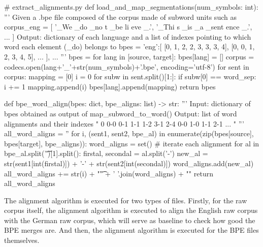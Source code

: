 \begin{python}
# extract_alignments.py
def load_and_map_segmentations(num_symbols: int):
  '''
  Given a .bpe file composed of the corpus made of subword units such as
  corpus_eng = [
    '_We _do _no t _be li eve _.',
    '_Thi s _is _a _sent ence _.',
    ...
  ]
  Output: dictionary of each language and 
  a list of indexes pointing to which word each element (_do) belongs to
  bpes = {
    'eng':[
      [0, 1, 2, 2, 3, 3, 3, 4],
      [0, 0, 1, 2, 3, 4, 5],
      ...
    ],
    ...
  } 
  '''
  bpes = {}
  for lang in [source, target]:
    bpes[lang] = []
    corpus = codecs.open(lang+'_'+str(num_symbols)+'.bpe', encoding='utf-8')
    for sent in corpus:
      mapping = [0]
      i = 0
      for subw in sent.split()[1:]:
        if subw[0] == word_sep:
          i += 1
        mapping.append(i)
      bpes[lang].append(mapping)
  return bpes

def bpe_word_align(bpes: dict, bpe_aligns: list) -> str:
  '''
  Input: dictionary of bpes obtained as output of map_subword_to_word()
  Output: list of word alignments and their indexes
    "
      0   0-0 0-1 1-1 1-2 3-1 2-4    0-0 1-0 1-1 2-1 \n
      ...
    "
  '''
  all_word_aligns = ''
  for i, (sent1, sent2, bpe_al) in enumerate(zip(bpes[source], bpes[target], bpe_aligns)):
    word_aligns = set()
    # iterate each alignment
    for al in bpe_al.split('\t')[1].split():
      firstal, secondal = al.split('-')
      new_al = str(sent1[int(firstal)]) + '-' + str(sent2[int(secondal)])
      word_aligns.add(new_al)
    all_word_aligns += str(i) + "\t" + ' '.join(word_aligns) + "\n"
  return all_word_aligns
\end{python}

The alignment algorithm is executed for two types of files. Firstly, for the raw corpus itself, the alignment algorithm is executed to align the English raw corpus with the German raw corpus, which will serve as baseline to check how good the BPE merges are. And then, the alignment algorithm is executed for the BPE files themselves.

